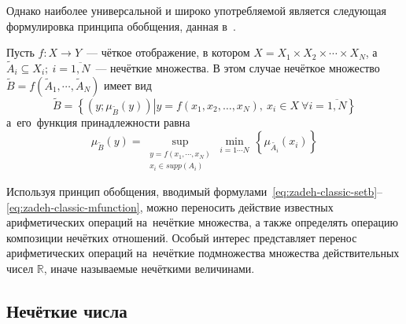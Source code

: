 Однако наиболее универсальной и широко употребляемой является следующая формулировка принципа обобщения, данная в~\cite{Rutkovskaya, Yakhyaeva}. 
\begin{mydef}
Пусть $f:X\to Y$~--- чёткое отображение, в котором $X=X_1 \times X_2 \times \cdots \times X_N$, а $\tilde A_i \subseteq X_i;\ i=\overline{1,N}$~--- нечёткие множества. В этом случае нечёткое множество $\tilde{B}=f\left( {{{\tilde{A}}}_{1}},\cdots,{{{\tilde{A}}}_{N}} \right)$ имеет вид
\begin{equation}
\label{eq:zadeh-classic-setb}
	\tilde{B}=\left\{ \left( y; \mu_{\tilde B} \left( y \right) \right)\left| y=f\left( x_1, x_2, \dots, x_N \right),\ x_i \in X\ \forall i=\overline{1,N} \right. \right\}
\end{equation}
а~его~функция принадлежности равна
\begin{equation}
\label{eq:zadeh-classic-mfunction}
	\mu_{\tilde B} \left( y \right)=\underset{
		\begin{smallmatrix} 
			 y=f\left( x_1, \cdots, x_N \right) \\ 
			 {{x}_{i}}\in supp\left( {{A}_{i}} \right) 
		\end{smallmatrix}}
	{\mathop{\sup }} {} \underset{i=1\cdots N}{\mathop{\min }} {}\, 
	\left\{ \mu_{\tilde {A_i}} \left( x_i \right ) \right \}
\end{equation}
\end{mydef}
Используя принцип обобщения, вводимый формулами~\eqref{eq:zadeh-classic-setb}--\eqref{eq:zadeh-classic-mfunction}, можно переносить действие известных арифметических операций на~нечёткие множества, а также определять операцию композиции нечётких отношений. Особый интерес представляет перенос арифметических операций на~нечёткие подмножества множества действительных чисел $\mathbb{R}$, иначе называемые нечёткими величинами.

\subsection{Нечёткие числа}

